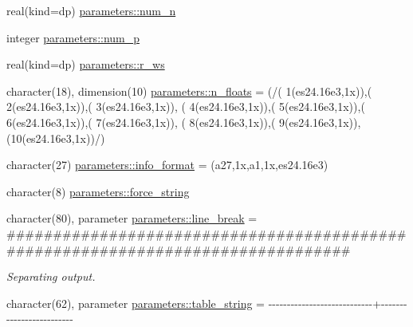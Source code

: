 \begin{DoxyCompactItemize}
\item 
real(kind=dp) \mbox{\hyperlink{group__EXT__PROFILES_ga9fdeb5df8ae40efefdff5ae559099b6e}{parameters\+::num\+\_\+n}}
\item 
integer \mbox{\hyperlink{group__EXT__PROFILES_ga25fb3b9dce82aa8bfe7e1f8e99d66edf}{parameters\+::num\+\_\+p}}
\item 
real(kind=dp) \mbox{\hyperlink{group__EXT__PROFILES_gadf4b1a873d7f2b95b72c0503f71462c4}{parameters\+::r\+\_\+ws}}
\item 
character(18), dimension(10) \mbox{\hyperlink{group__FORMATS_ga75e55b6ae9f977f08dcde5798efa2520}{parameters\+::n\+\_\+floats}} = (/\textquotesingle{}( 1(es24.\+16e3,1x))\textquotesingle{},\textquotesingle{}( 2(es24.\+16e3,1x))\textquotesingle{},\textquotesingle{}( 3(es24.\+16e3,1x))\textquotesingle{}, \textquotesingle{}( 4(es24.\+16e3,1x))\textquotesingle{},\textquotesingle{}( 5(es24.\+16e3,1x))\textquotesingle{},\textquotesingle{}( 6(es24.\+16e3,1x))\textquotesingle{},\textquotesingle{}( 7(es24.\+16e3,1x))\textquotesingle{}, \textquotesingle{}( 8(es24.\+16e3,1x))\textquotesingle{},\textquotesingle{}( 9(es24.\+16e3,1x))\textquotesingle{},\textquotesingle{}(10(es24.\+16e3,1x))\textquotesingle{}/)
\item 
character(27) \mbox{\hyperlink{group__FORMATS_ga1d71f88907da2dbb383e489d23cf1346}{parameters\+::info\+\_\+format}} = \textquotesingle{}(a27,1x,a1,1x,es24.\+16e3)\textquotesingle{}
\item 
character(8) \mbox{\hyperlink{group__STRINGS_gaf1698471c98154361a7783b3bd76fc9b}{parameters\+::force\+\_\+string}}
\item 
character(80), parameter \mbox{\hyperlink{group__STRINGS_ga757aedae1ca22891e6971eee77226285}{parameters\+::line\+\_\+break}} = \textquotesingle{}\#\#\#\#\#\#\#\#\#\#\#\#\#\#\#\#\#\#\#\#\#\#\#\#\#\#\#\#\#\#\#\#\#\#\#\#\#\#\#\#\#\#\#\#\#\#\#\#\#\#\#\#\#\#\#\#\#\#\#\#\#\#\#\#\#\#\#\#\#\#\#\#\#\#\#\#\#\#\#\#\textquotesingle{}
\begin{DoxyCompactList}\small\item\em Separating output. \end{DoxyCompactList}\item 
character(62), parameter \mbox{\hyperlink{group__STRINGS_ga4074473b9d6e05d0b912b06d42301755}{parameters\+::table\+\_\+string}} = \textquotesingle{}-\/-\/-\/-\/-\/-\/-\/-\/-\/-\/-\/-\/-\/-\/-\/-\/-\/-\/-\/-\/-\/-\/-\/-\/-\/-\/-\/-\/+-\/-\/-\/-\/-\/-\/-\/-\/-\/-\/-\/-\/-\/-\/-\/-\/-\/-\/-\/-\/-\/-\/-\/-\/-\/\textquotesingle{}
\item 

\end{DoxyCompactItemize}
